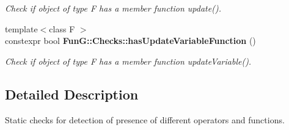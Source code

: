 \begin{DoxyCompactItemize}
\begin{DoxyCompactList}\small\item\em Check if object of type F has a member function update(). \end{DoxyCompactList}\item 
\hypertarget{namespaceFunG_1_1Checks_abf97e91c1bf458c62f9f3a3ecf5edf1a}{{\footnotesize template$<$class F $>$ }\\constexpr bool {\bfseries Fun\-G\-::\-Checks\-::has\-Update\-Variable\-Function} ()}\label{namespaceFunG_1_1Checks_abf97e91c1bf458c62f9f3a3ecf5edf1a}

\begin{DoxyCompactList}\small\item\em Check if object of type F has a member function update\-Variable(). \end{DoxyCompactList}\end{DoxyCompactItemize}


\subsection{Detailed Description}
Static checks for detection of presence of different operators and functions. 